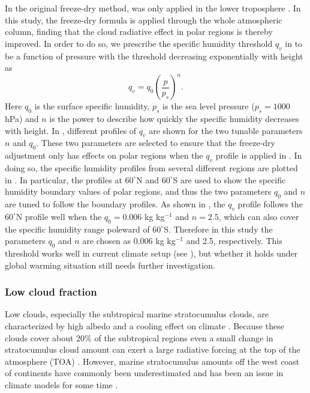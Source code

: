 In the original freeze-dry method,  was only applied in the lower troposphere \citep{Vavrus2008}. In this study, the freeze-dry formula is applied through the whole atmospheric column, finding that the cloud radiative effect in polar regions is thereby improved. In order to do so, we prescribe the specific humidity threshold $q_v$ in  to be a function of pressure with the threshold decreasing exponentially with height as
\begin{equation}
	q_{v} = q_0\left(\frac{p}{p_s}\right)^n.
	\label{eq:qv_freeze-dry}
\end{equation}
Here $q_0$ is the surface specific humidity, $p_s$ is the sea level pressure ($p_s=1000$ hPa) and $n$ is the power to describe how quickly the specific humidity decreases with height. In , different profiles of $q_v$ are shown for the two tunable parameters $n$ and $q_0$. These two parameters are selected to ensure that the freeze-dry adjustment only has effects on polar regions when the $q_v$ profile is applied in . In doing so, the specific humidity profiles from several different regions are plotted in . In particular, the profiles at $60^{\circ}$N and $60^{\circ}$S are used to show the specific humidity boundary values of polar regions, and thus the two parameters $q_0$ and $n$ are tuned to follow the boundary profiles. As shown in , the $q_v$ profile follows the $60^{\circ}$N profile well when the $q_0=0.006$ kg kg$^{-1}$ and $n=2.5$, which can also cover the specific humidity range poleward of $60^{\circ}$S. Therefore in this study the parameters $q_0$ and $n$ are chosen as 0.006 kg kg$^{-1}$ and 2.5, respectively. This threshold works well in current climate setup (see ), but whether it holds under global warming situation still needs further investigation.


\subsubsection{Low cloud fraction}
\label{sec:marine_low_cld_scheme}

Low clouds, especially the subtropical marine stratocumulus clouds, are characterized by high albedo and a cooling effect on climate \citep{Hartmann2016}. Because these clouds cover about 20\% of the subtropical regions even a small change in stratocumulus cloud amount can exert a large radiative forcing at the top of the atmosphere (TOA) \citep{Slingo1990}. However, marine stratocumulus amounts off the west coast of continents have commonly been underestimated and has been an issue in climate models for some time \citep[e.g.,][]{Nam2012, Lauer2013, Dolinar2015}.

